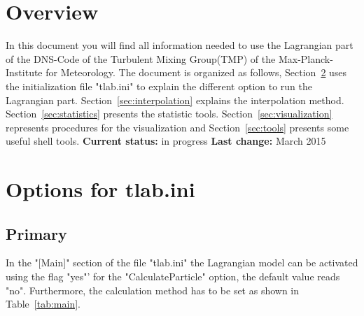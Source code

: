 \documentclass[12pt]{article}
\begin{document}
\maketitle

\section{Overview}
In this document you will find all information needed to use the Lagrangian part of the DNS-Code of the Turbulent Mixing Group(TMP) of the Max-Planck-Institute for Meteorology. The document is organized as follows, Section~\ref{sec:options} uses the initialization file "tlab.ini" to explain the different option to run the Lagrangian part. Section~\ref{sec:interpolation} explains the interpolation method. Section~\ref{sec:statistics} presents the statistic tools. Section~\ref{sec:visualization} represents procedures for the visualization and Section~\ref{sec:tools} presents some useful shell tools.\newline
\textbf{Current status:} in progress \newline
\textbf{Last change:} March 2015
\newpage
\section{Options for tlab.ini}
\label{sec:options}
\subsection{Primary}
In the "[Main]" section of the file "tlab.ini" the Lagrangian model can be activated using the flag "yes"' for the "CalculateParticle" option, the default value reads "no". Furthermore, the calculation method has to be set as shown in Table~\ref{tab:main}. 
\begin{table}
    \caption{Options which can be set in [Main] of "tlab.ini".}
    \label{tab:main}
\end{table}
\end{document}
